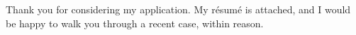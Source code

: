 
Thank you for considering my application. My r\'esum\'e is attached, and I would be happy to walk you through a recent case, within reason.
